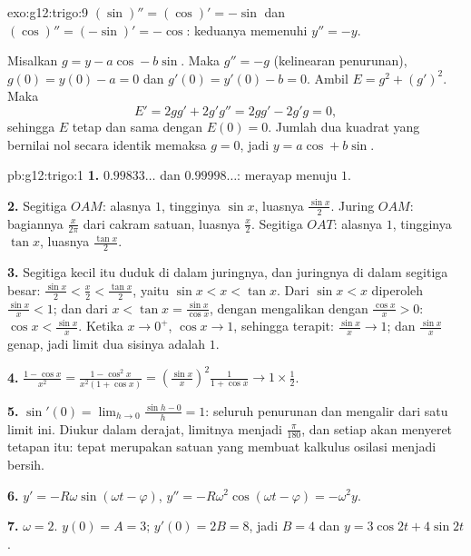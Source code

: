 \begin{solution}{exo:g12:trigo:9}
$(\sin)'' = (\cos)' = -\sin$ dan $(\cos)'' = (-\sin)' = -\cos$: keduanya
memenuhi $y'' = -y$.

Misalkan $g = y - a\cos - b\sin$. Maka $g'' = -g$ (kelinearan penurunan),
$g(0) = y(0) - a = 0$ dan $g'(0) = y'(0) - b = 0$. Ambil
$E = g^2 + (g')^2$. Maka
\[
E' = 2g g' + 2g' g'' = 2g g' - 2g' g = 0,
\]
sehingga $E$ tetap dan sama dengan $E(0) = 0$. Jumlah dua kuadrat yang
bernilai nol secara identik memaksa $g = 0$, jadi $y = a\cos + b\sin$.
\end{solution}

\begin{solution}{pb:g12:trigo:1}
\textbf{1.} $0.99833\ldots$ dan $0.99998\ldots$: merayap menuju
$1$.

\textbf{2.} Segitiga $OAM$: alasnya $1$, tingginya $\sin x$, luasnya
$\frac{\sin x}{2}$. Juring $OAM$: bagiannya
$\frac{x}{2\pi}$ dari cakram satuan, luasnya $\frac x2$. Segitiga
$OAT$: alasnya $1$, tingginya $\tan x$, luasnya $\frac{\tan x}{2}$.

\textbf{3.} Segitiga kecil itu duduk di dalam juringnya, dan juringnya di
dalam segitiga besar: $\frac{\sin x}{2} < \frac x2 < \frac{\tan x}{2}$,
yaitu $\sin x < x < \tan x$. Dari $\sin x < x$ diperoleh
$\frac{\sin x}{x} < 1$; dan dari
$x < \tan x = \frac{\sin x}{\cos x}$, dengan mengalikan dengan
$\frac{\cos x}{x} > 0$: $\cos x < \frac{\sin x}{x}$. Ketika
$x \to 0^+$, $\cos x \to 1$, sehingga terapit:
$\frac{\sin x}{x} \to 1$; dan $\frac{\sin x}{x}$ genap, jadi
limit dua sisinya adalah $1$.

\textbf{4.} $\frac{1 - \cos x}{x^2} =
\frac{1 - \cos^2 x}{x^2 (1 + \cos x)} =
\left(\frac{\sin x}{x}\right)^2 \frac{1}{1 + \cos x}
\to 1 \times \frac12$.

\textbf{5.} $\sin'(0) = \lim_{h \to 0} \frac{\sin h - 0}{h} =
1$: seluruh penurunan  dan  mengalir dari
satu limit ini. Diukur dalam derajat, limitnya menjadi
$\frac{\pi}{180}$, dan setiap  akan menyeret
tetapan itu:  tepat merupakan satuan yang membuat kalkulus
osilasi menjadi bersih.

\textbf{6.} $y' = -R\omega\sin(\omega t - \varphi)$,
$y'' = -R\omega^2\cos(\omega t - \varphi) = -\omega^2 y$.

\textbf{7.} $\omega = 2$. $y(0) = A = 3$;
$y'(0) = 2B = 8$, jadi $B = 4$ dan $y = 3\cos 2t + 4\sin 2t$.


\end{solution}
